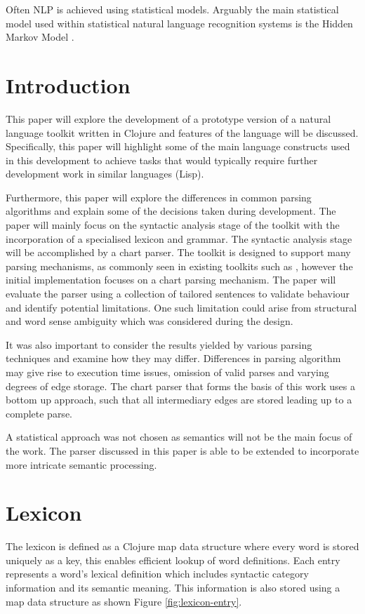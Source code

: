 \documentclass[11pt, a4paper]{article}
\begin{document}
Often NLP is achieved using statistical models. Arguably the main statistical model used within statistical natural language recognition systems is the Hidden Markov Model \cite{7_manningschutze_1999}. 

\section{Introduction}\label{sec:into}
This paper will explore the development of a prototype version of a natural language toolkit written in Clojure and features of the language will be discussed. Specifically, this paper will highlight some of the main language constructs used in this development to achieve tasks that would typically require further development work in similar languages (Lisp).

Furthermore, this paper will explore the differences in common parsing algorithms and explain some of the decisions taken during development. The paper will mainly focus on the syntactic analysis stage of the toolkit with the incorporation of a specialised lexicon and grammar. The syntactic analysis stage will be accomplished by a chart parser. The toolkit is designed to support many parsing mechanisms, as commonly seen in existing toolkits such as \cite{nltk16}, however the initial implementation focuses on a chart parsing mechanism. The paper will evaluate the parser using a collection of tailored sentences to validate behaviour and identify potential limitations. One such limitation could arise from structural and word sense ambiguity which was considered during the design.

It was also important to consider the results yielded by various parsing techniques and examine how they may differ. Differences in parsing algorithm may give rise to execution time issues, omission of valid parses and varying degrees of edge storage. The chart parser that forms the basis of this work uses a bottom up approach, such that all intermediary edges are stored leading up to a complete parse. 

A statistical approach was not chosen as semantics will not be the main focus of the work. The parser discussed in this paper is able to be extended to incorporate more intricate semantic processing. 

\section{Lexicon}\label{sec:lexicon}
The lexicon is defined as a Clojure map data structure where every word is stored uniquely as a key, this enables efficient lookup of word definitions. Each entry represents a word's lexical definition which includes syntactic category information and its semantic meaning. This information is also stored using a map data structure as shown Figure \ref{fig:lexicon-entry}.
\end{document}
